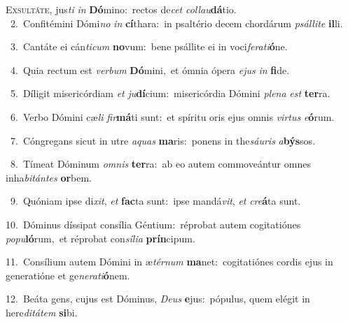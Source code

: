 \lettrine{\initial\textcolor{\initialcolor}{E}}{xsultáte,} jus\textit{ti} \textit{in} \textbf{Dó}\-mino:~\star rectos de\textit{cet} \textit{col}\-\textit{lau}\textbf{dá}tio.\\
{\numbfont\textcolor{\numbcolor}{~2.}}~Confitémini Dómi\textit{no} \textit{in} \textbf{cí}\-thara:~\star in psaltério decem chordárum \textit{psál}\-\textit{li}\textit{te} \textbf{il}\-li.\par
{\numbfont\textcolor{\numbcolor}{~3.}}~Cantáte ei cán\-\textit{ti}\-\textit{cum} \textbf{no}\-vum:~\star bene psállite ei in voci\-\textit{fe}\-\textit{ra}\textit{ti}\textbf{ó}ne.\par
{\numbfont\textcolor{\numbcolor}{~4.}}~Quia rectum est \textit{ver}\-\textit{bum} \textbf{Dó}\-mini,~\star et ómnia ópera \textit{e}\-\textit{jus} \textit{in} \textbf{fi}\-de.\par
{\numbfont\textcolor{\numbcolor}{~5.}}~Díligit misericórdiam \textit{et} \textit{ju}\-\textbf{dí}cium:~\star misericórdia Dómini \textit{ple}\-\textit{na} \textit{est} \textbf{ter}\-ra.\par
{\numbfont\textcolor{\numbcolor}{~6.}}~Verbo Dómini cæ\textit{li} \textit{fir}\-\textbf{má}ti sunt:~\star et spíritu oris ejus omnis \textit{vir}\-\textit{tus} \textit{e}\-\textbf{ó}rum.\par
{\numbfont\textcolor{\numbcolor}{~7.}}~Cóngregans sicut in utre \textit{a}\-\textit{quas} \textbf{ma}\-ris:~\star ponens in the\-\textit{sáu}\-\textit{ris} \textit{a}\-\textbf{býs}sos.\par
{\numbfont\textcolor{\numbcolor}{~8.}}~Tímeat Dóminum \textit{om}\-\textit{nis} \textbf{ter}\-ra:~\star ab eo autem commoveántur omnes inha\-\textit{bi}\-\textit{tán}\textit{tes} \textbf{or}\-bem.\par
{\numbfont\textcolor{\numbcolor}{~9.}}~Quóniam ipse di\-\textit{xit}\-, \textit{et} \textbf{fac}\-ta sunt:~\star ipse mandá\-\textit{vit}\-, \textit{et} \textit{cre}\-\textbf{á}ta sunt.\par
{\numbfont\textcolor{\numbcolor}{10.}}~Dóminus díssipat consília Géntium:~\dagger réprobat autem cogitatiónes \textit{po}\-\textit{pu}\textbf{ló}rum,~\star et réprobat con\-\textit{sí}\-\textit{li}\textit{a} \textbf{prín}\-cipum.\par
{\numbfont\textcolor{\numbcolor}{11.}}~Consílium autem Dómini in æ\-\textit{tér}\-\textit{num} \textbf{ma}\-net:~\star cogitatiónes cordis ejus in generatióne et ge\-\textit{ne}\-\textit{ra}\textit{ti}\textbf{ó}nem.\par
{\numbfont\textcolor{\numbcolor}{12.}}~Beáta gens, cujus est Dóminus, \textit{De}\-\textit{us} \textbf{e}\-jus:~\star pópulus, quem elégit in here\-\textit{di}\-\textit{tá}\textit{tem} \textbf{si}\-bi.\par
